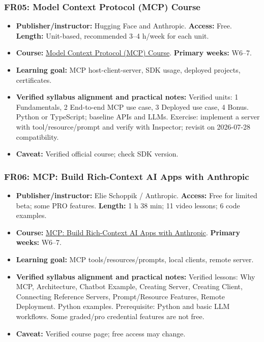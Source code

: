\documentclass[
  10pt,
]{article}
\providecommand{\tightlist}{%
  \setlength{\itemsep}{0pt}\setlength{\parskip}{0pt}}
\begin{document}
\subsubsection{FR05: Model Context Protocol (MCP)
Course}\label{fr05-model-context-protocol-mcp-course}

\begin{itemize}
\tightlist
\item
  \textbf{Publisher/instructor:} Hugging Face and Anthropic.
  \textbf{Access:} Free. \textbf{Length:} Unit-based, recommended 3--4
  h/week for each unit.
\item
  \textbf{Course:}
  \href{https://huggingface.co/learn/mcp-course/unit0/introduction}{Model
  Context Protocol (MCP) Course}. \textbf{Primary weeks:} W6--7.
\item
  \textbf{Learning goal:} MCP host-client-server, SDK usage, deployed
  projects, certificates.
\item
  {\raggedright \textbf{Verified syllabus alignment and practical notes:} Verified
  units: 1 Fundamentals, 2 End-to-end MCP use case, 3 Deployed use case,
  4 Bonus. Python or TypeScript; baseline APIs and LLMs. Exercise:
  implement a server with tool/\allowbreak resource/\allowbreak prompt and verify with
  Inspector; revisit on 2026-07-28 compatibility.\par}
\item
  \textbf{Caveat:} Verified official course; check SDK version.
\end{itemize}

\subsubsection{FR06: MCP: Build Rich-Context AI Apps with
Anthropic}\label{fr06-mcp-build-rich-context-ai-apps-with-anthropic}

\begin{itemize}
\tightlist
\item
  \textbf{Publisher/instructor:} Elie Schoppik / Anthropic.
  \textbf{Access:} Free for limited beta; some PRO features.
  \textbf{Length:} 1 h 38 min; 11 video lessons; 6 code examples.
\item
  \textbf{Course:}
  \href{https://www.deeplearning.ai/courses/mcp-build-rich-context-ai-apps-with-anthropic}{MCP:
  Build Rich-Context AI Apps with Anthropic}. \textbf{Primary weeks:}
  W6--7.
\item
  \textbf{Learning goal:} MCP tools/resources/prompts, local clients,
  remote server.
\item
  {\raggedright \textbf{Verified syllabus alignment and practical notes:} Verified
  lessons: Why MCP, Architecture, Chatbot Example, Creating Server,
  Creating Client, Connecting Reference Servers, Prompt/\allowbreak Resource
  Features, Remote Deployment. Python examples. Prerequisite: Python and
  basic LLM workflows. Some graded/\allowbreak pro credential features are not free.\par}
\item
  \textbf{Caveat:} Verified course page; free access may change.
\end{itemize}
\end{document}
